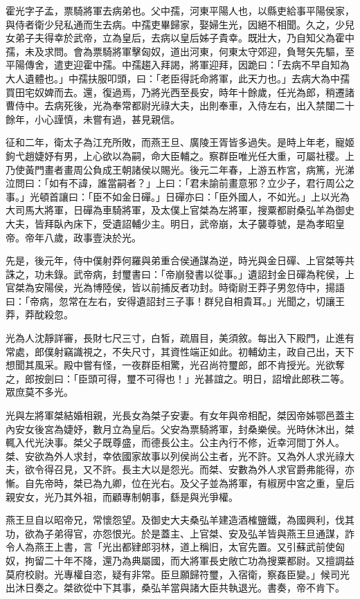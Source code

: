 
\begin{pinyinscope}
霍光字子孟，票騎將軍去病弟也。父中孺，河東平陽人也，以縣吏給事平陽侯家，與侍者衛少兒私通而生去病。中孺吏畢歸家，娶婦生光，因絕不相聞。久之，少兒女弟子夫得幸於武帝，立為皇后，去病以皇后姊子貴幸。既壯大，乃自知父為霍中孺，未及求問。會為票騎將軍擊匈奴，道出河東，何東太守郊迎，負弩矢先驅，至平陽傳舍，遣吏迎霍中孺。中孺趨入拜謁，將軍迎拜，因跪曰：「去病不早自知為大人遺體也。」中孺扶服叩頭，曰：「老臣得託命將軍，此天力也。」去病大為中孺買田宅奴婢而去。還，復過焉，乃將光西至長安，時年十餘歲，任光為郎，稍遷諸曹侍中。去病死後，光為奉常都尉光祿大夫，出則奉車，入侍左右，出入禁闥二十餘年，小心謹慎，未嘗有過，甚見親信。

征和二年，衛太子為江充所敗，而燕王旦、廣陵王胥皆多過失。是時上年老，寵姬鉤弋趙婕妤有男，上心欲以為嗣，命大臣輔之。察群臣唯光任大重，可屬社稷。上乃使黃門畫者畫周公負成王朝諸侯以賜光。後元二年春，上游五柞宮，病篤，光涕泣問曰：「如有不諱，誰當嗣者？」上曰：「君未諭前畫意邪？立少子，君行周公之事。」光頓首讓曰：「臣不如金日磾。」日磾亦曰：「臣外國人，不如光。」上以光為大司馬大將軍，日磾為車騎將軍，及太僕上官桀為左將軍，搜粟都尉桑弘羊為御史大夫，皆拜臥內床下，受遺詔輔少主。明日，武帝崩，太子襲尊號，是為孝昭皇帝。帝年八歲，政事壹決於光。

先是，後元年，侍中僕射莽何羅與弟重合侯通謀為逆，時光與金日磾、上官桀等共誅之，功未錄。武帝病，封璽書曰：「帝崩發書以從事。」遺詔封金日磾為秺侯，上官桀為安陽侯，光為博陸侯，皆以前捕反者功封。時衛尉王莽子男忽侍中，揚語曰：「帝病，忽常在左右，安得遺詔封三子事！群兒自相貴耳。」光聞之，切讓王莽，莽酖殺忽。

光為人沈靜詳審，長財七尺三寸，白皙，疏眉目，美須敘。每出入下殿門，止進有常處，郎僕射竊識視之，不失尺寸，其資性端正如此。初輔幼主，政自己出，天下想聞其風采。殿中嘗有怪，一夜群臣相驚，光召尚符璽郎，郎不肯授光。光欲奪之，郎按劍曰：「臣頭可得，璽不可得也！」光甚誼之。明日，詔增此郎秩二等。眾庶莫不多光。

光與左將軍桀結婚相親，光長女為桀子安妻。有女年與帝相配，桀因帝姊鄂邑蓋主內安女後宮為婕妤，數月立為皇后。父安為票騎將軍，封桑樂侯。光時休沐出，桀輒入代光決事。桀父子既尊盛，而德長公主。公主內行不修，近幸河間丁外人。桀、安欲為外人求封，幸依國家故事以列侯尚公主者，光不許。又為外人求光祿大夫，欲令得召見，又不許。長主大以是怨光。而桀、安數為外人求官爵弗能得，亦慚。自先帝時，桀已為九卿，位在光右。及父子並為將軍，有椒房中宮之重，皇后親安女，光乃其外祖，而顧專制朝事，繇是與光爭權。

燕王旦自以昭帝兄，常懷怨望。及御史大夫桑弘羊建造酒榷鹽鐵，為國興利，伐其功，欲為子弟得官，亦怨恨光。於是蓋主、上官桀、安及弘羊皆與燕王旦通謀，詐令人為燕王上書，言「光出都肄郎羽林，道上稱旧，太官先置。又引蘇武前使匈奴，拘留二十年不降，還乃為典屬國，而大將軍長史敞亡功為搜粟都尉。又擅調益莫府校尉。光專權自恣，疑有非常。臣旦願歸符璽，入宿衛，察姦臣變。」候司光出沐日奏之。桀欲從中下其事，桑弘羊當與諸大臣共執退光。書奏，帝不肯下。


\end{pinyinscope}
